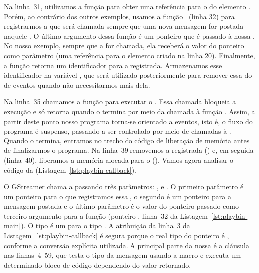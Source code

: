 Na linha~31, utilizamos a função  para obter uma
referência para o  do elemento . Porém, ao contrário dos
outros exemplos, usamos a função
~(linha 32) para registrarmos
a   que será chamada sempre que uma nova mensagem
for postada naquele . O último argumento dessa função é um ponteiro
que é passado à nossa . No nosso exemplo, sempre que a
  for chamada, ela receberá o valor do ponteiro 
 como parâmetro (uma referência para o elemento  criado
na linha 20). Finalmente, a função 
retorna um identificador para a  registrada. Armazenamos esse
identificador na variável , que será utilizado posteriormente para
remover essa  do  de eventos quando não necessitarmos
mais dela.

Na linha~35 chamamos a função  para executar o
. Essa chamada bloqueia a execução e só retorna quando o 
termina por meio da chamada à função . Assim, a partir
deste ponto nosso programa torna-se orientado a eventos, isto é, o fluxo do
programa é suspenso, passando a ser controlado por meio de chamadas à 
 . Quando o  termina, entramos no trecho
do código de liberação de memória antes de finalizarmos o programa. Na linha~39
removemos a  registrada () e, em seguida
(linha~40), liberamos a memória alocada para o 
(). Vamos agora analisar o código da  
 (Listagem~\ref{lst:playbin-callback}).



O GStreamer chama a   passando três parâmetros:
,  e . O primeiro parâmetro é um ponteiro para o 
que registramos essa , o segundo é um ponteiro para a mensagem
postada e o último parâmetro é o valor do ponteiro passado como terceiro
argumento para a função  (ponteiro , linha~32
da Listagem~\ref{lst:playbin-main}). O tipo  é um  para
o tipo . A atribuição da linha~3 da
Listagem~\ref{lst:playbin-callback} é segura porque o real tipo do ponteiro
 é , conforme a conversão explícita utilizada.
A principal parte da nossa  é a cláusula  nas
linhas~4--59, que testa o tipo da mensagem usando a macro 
e executa um determinado bloco de código dependendo do valor retornado. 

